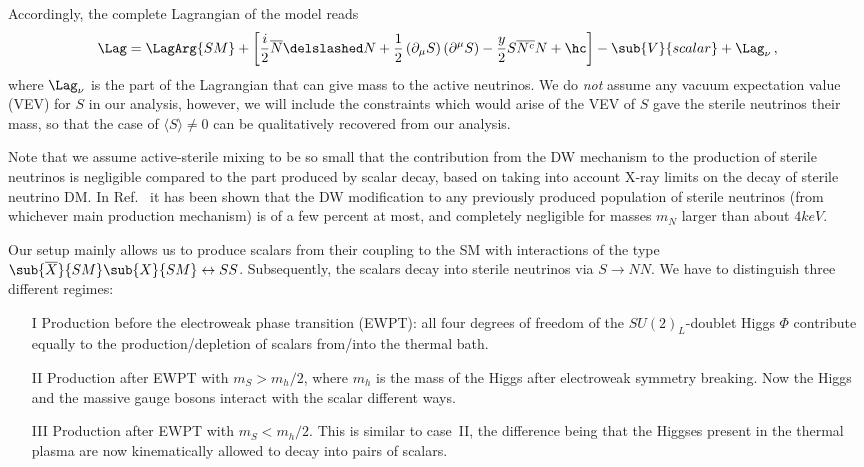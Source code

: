 Accordingly, the complete Lagrangian of the model reads
\begin{align}
  \Lag = \LagArg{SM} + \left[\frac{i}{2}\overline{N} \delslashed N + \frac{1}{2}\left(\partial_\mu S\right)\left(\partial^\mu S\right) - \frac{y}{2}S\overline{N^c}N +\hc \right] - \sub{V}{scalar} + \Lag_\nu \,,
 \label{eq:ModelLagrangian}
\end{align}
where $\Lag_\nu$ is the part of the Lagrangian that can give mass to the active neutrinos. We do \emph{not} assume any vacuum expectation value (VEV) for $S$ in our analysis, however, we will include the constraints which would arise of the VEV of $S$ gave the sterile neutrinos their mass, so that the case of $\langle S \rangle \neq 0$ can be qualitatively recovered from our analysis.

Note that we assume active-sterile mixing to be so small that the contribution from the DW mechanism to the production of sterile neutrinos is negligible compared to the part produced by scalar decay, based on taking into account X-ray limits on the decay of sterile neutrino DM. In Ref.~\cite{Merle:2015vzu} it has been shown that the DW modification to any previously produced population of sterile neutrinos (from whichever main production mechanism) is of a few percent at most, and completely negligible for masses $m_N$ larger than about $\unit{4}{keV}$.

Our setup mainly allows us to produce scalars from their coupling to the SM with interactions of the type $\sub{\overline{X}}{SM}\sub{X}{SM} \leftrightarrow SS$. Subsequently, the scalars decay into sterile neutrinos via $S \rightarrow N N$. We have to distinguish three different regimes:
\begin{enumerate}
 \item[I] Production before the electroweak phase transition (EWPT): all four degrees of freedom of the $SU(2)_L$-doublet Higgs $\Phi$ contribute equally to the production/depletion of scalars from/into the thermal bath.
 \item[II] Production after EWPT with $m_S > m_h/2$, where $m_h$ is the mass of the Higgs after electroweak symmetry breaking. Now the Higgs and the massive gauge bosons interact with the scalar different ways.
 \item[III] Production after EWPT with $m_S < m_h/2$. This is similar to case~II, the difference being that the Higgses present in the thermal plasma are now kinematically allowed to decay into pairs of scalars.
\end{enumerate}

